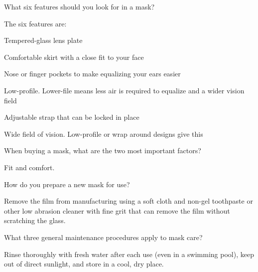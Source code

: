 	\begin{qanda}
		\begin{question}
What six features should you look for in a mask?
		\end{question}

		\begin{answer}
The six features are:
			\begin{nospacenumberedlist}
				\item Tempered-glass lens plate
				\item Comfortable skirt with a close fit to your face
				\item Nose or finger pockets to make equalizing your ears easier
				\item Low-profile.  Lower-file means less air is required to equalize and a wider vision field
				\item Adjustable strap that can be locked in place
				\item Wide field of vision.  Low-profile or wrap around designs give this
			\end{nospacenumberedlist}
		\end{answer}
	\end{qanda}

	\begin{qanda}
		\begin{question}
When buying a mask, what are the two most important factors?
		\end{question}

		\begin{answer}
Fit and comfort.
		\end{answer}
	\end{qanda}

	\begin{qanda}
		\begin{question}
How do you prepare a new mask for use?
		\end{question}

		\begin{answer}
Remove the film from manufacturing using a soft cloth and non-gel toothpaste or other low abrasion cleaner with fine grit that can remove the film without scratching the glass.
		\end{answer}
	\end{qanda}

	\begin{qanda}
		\begin{question}
What three general maintenance procedures apply to mask care?
		\end{question}

		\begin{answer}
Rinse thoroughly with fresh water after each use (even in a swimming pool), keep out of direct sunlight, and store in a cool, dry place.
		\end{answer}
	\end{qanda}

